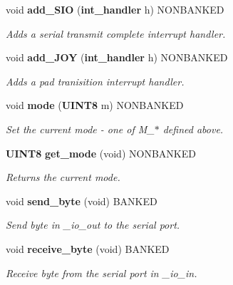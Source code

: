 \begin{CompactItemize}
\item 
void {\bf add\_\-SIO} ({\bf int\_\-handler} h) NONBANKED
\begin{CompactList}\small\item\em Adds a serial transmit complete interrupt handler.\item\end{CompactList}

\item 
void {\bf add\_\-JOY} ({\bf int\_\-handler} h) NONBANKED
\begin{CompactList}\small\item\em Adds a pad tranisition interrupt handler.\item\end{CompactList}

\item 
\label{gb.h_a63}
void {\bf mode} ({\bf UINT8} m) NONBANKED
\begin{CompactList}\small\item\em Set the current mode - one of M\_\-$\ast$ defined above.\item\end{CompactList}

\item 
\label{gb.h_a64}
{\bf UINT8} {\bf get\_\-mode} (void) NONBANKED
\begin{CompactList}\small\item\em Returns the current mode.\item\end{CompactList}

\item 
\label{gb.h_a65}
void {\bf send\_\-byte} (void) BANKED
\begin{CompactList}\small\item\em Send byte in \_\-io\_\-out to the serial port.\item\end{CompactList}

\item 
\label{gb.h_a66}
void {\bf receive\_\-byte} (void) BANKED
\begin{CompactList}\small\item\em Receive byte from the serial port in \_\-io\_\-in.\item\end{CompactList}


\end{CompactItemize}

